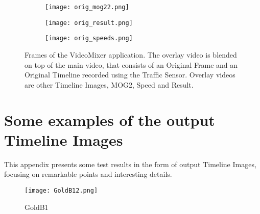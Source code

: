 \begin{figure}[!h]
	\centering
	\begin{subfigure}[t]{0.6\textwidth}
		\texttt{[image: orig\_mog22.png]}
	\end{subfigure}
	\hfill
	\begin{subfigure}[t]{0.6\textwidth}
		\texttt{[image: orig\_result.png]}
	\end{subfigure}
	\hfill
	\begin{subfigure}[t]{0.6\textwidth}
		\texttt{[image: orig\_speeds.png]}
	\end{subfigure}

	\caption{Frames of the VideoMixer application. The overlay video is blended on top of the main video, that consists of an Original Frame and an Original Timeline recorded using the Traffic Sensor. Overlay videos are other Timeline Images, MOG2, Speed and Result.\label{fig:video_mixer_frames}}
\end{figure}

\clearpage\section{Some examples of the output Timeline Images}\label{app:TIs}
This appendix presents some test results in the form of output Timeline Images, focusing on remarkable points and interesting details.

\centering
\begin{figure}[h!]
	\centering
	\texttt{[image: GoldB12.png]}
	\caption[]{GoldB1}%
\end{figure}

